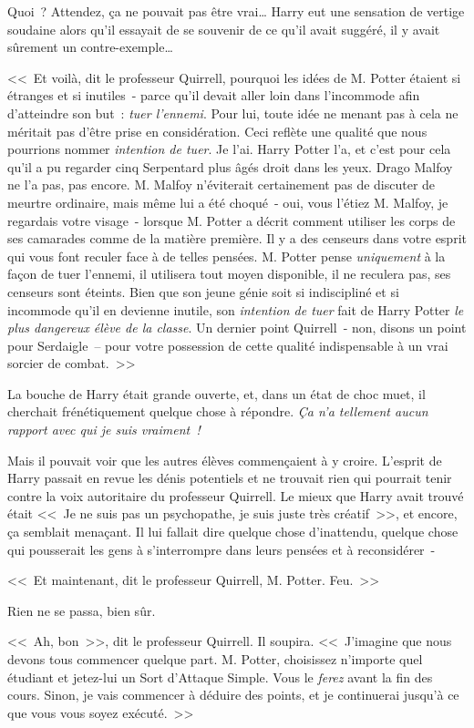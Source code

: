 Quoi~? Attendez, ça ne pouvait pas être vrai… Harry eut une sensation de vertige soudaine alors qu'il essayait de se souvenir de ce qu'il avait suggéré, il y avait sûrement un contre-exemple…

<<~Et voilà, dit le professeur Quirrell, pourquoi les idées de M. Potter étaient si étranges et si inutiles~- parce qu'il devait aller loin dans l'incommode afin d'atteindre son but~: \emph{tuer l'ennemi}. Pour lui, toute idée ne menant pas à cela ne méritait pas d'être prise en considération. Ceci reflète une qualité que nous pourrions nommer \emph{intention de tuer}. Je l'ai. Harry Potter l'a, et c'est pour cela qu'il a pu regarder cinq Serpentard plus âgés droit dans les yeux. Drago Malfoy ne l'a pas, pas encore. M. Malfoy n'éviterait certainement pas de discuter de meurtre ordinaire, mais même lui a été choqué~- oui, vous l'étiez M. Malfoy, je regardais votre visage~- lorsque M. Potter a décrit comment utiliser les corps de ses camarades comme de la matière première. Il y a des censeurs dans votre esprit qui vous font reculer face à de telles pensées. M. Potter pense \emph{uniquement} à la façon de tuer l'ennemi, il utilisera tout moyen disponible, il ne reculera pas, ses censeurs sont éteints. Bien que son jeune génie soit si indiscipliné et si incommode qu'il en devienne inutile, son \emph{intention de tuer} fait de Harry Potter \emph{le plus dangereux élève de la classe}. Un dernier point Quirrell~- non, disons un point pour Serdaigle~-- pour votre possession de cette qualité indispensable à un vrai sorcier de combat.~>>

La bouche de Harry était grande ouverte, et, dans un état de choc muet, il cherchait frénétiquement quelque chose à répondre. \emph{Ça n'a tellement aucun rapport avec qui je suis vraiment~!}

Mais il pouvait voir que les autres élèves commençaient à y croire. L'esprit de Harry passait en revue les dénis potentiels et ne trouvait rien qui pourrait tenir contre la voix autoritaire du professeur Quirrell. Le mieux que Harry avait trouvé était <<~Je ne suis pas un psychopathe, je suis juste très créatif~>>, et encore, ça semblait menaçant. Il lui fallait dire quelque chose d'inattendu, quelque chose qui pousserait les gens à s'interrompre dans leurs pensées et à reconsidérer~-

<<~Et maintenant, dit le professeur Quirrell, M. Potter. Feu.~>>

Rien ne se passa, bien sûr.

<<~Ah, bon~>>, dit le professeur Quirrell. Il soupira. <<~J'imagine que nous devons tous commencer quelque part. M. Potter, choisissez n'importe quel étudiant et jetez-lui un Sort d'Attaque Simple. Vous le \emph{ferez} avant la fin des cours. Sinon, je vais commencer à déduire des points, et je continuerai jusqu'à ce que vous vous soyez exécuté.~>>

